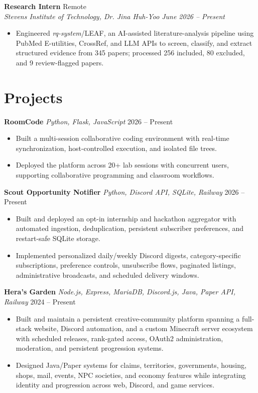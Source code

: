 \documentclass[letterpaper,10pt]{article}
\newcommand{\resumeentry}[4]{
  \noindent\textbf{#1} \hfill #2 \\
  \textit{#3} \hfill \textit{#4}
}
\newcommand{\projectentry}[3]{
  \noindent\textbf{#1} \textbar{} \textit{#2} \hfill #3
}
\begin{document}
\smallskip

\resumeentry
  {Research Intern}{Remote}
  {Stevens Institute of Technology, Dr. Jina Huh-Yoo}{June 2026 -- Present}
\begin{itemize}
  \item Engineered \textit{rq-system}/LEAF, an AI-assisted literature-analysis pipeline using PubMed E-utilities, CrossRef, and LLM APIs to screen, classify, and extract structured evidence from 345 papers; processed 256 included, 80 excluded, and 9 review-flagged papers.
\end{itemize}

\section{Projects}

\projectentry
  {RoomCode}
  {Python, Flask, JavaScript}
  {2026 -- Present}
\begin{itemize}
  \item Built a multi-session collaborative coding environment with real-time synchronization, host-controlled execution, and isolated file trees.
  \item Deployed the platform across 20+ lab sessions with concurrent users, supporting collaborative programming and classroom workflows.
\end{itemize}

\smallskip

\projectentry
  {Scout Opportunity Notifier}
  {Python, Discord API, SQLite, Railway}
  {2026 -- Present}
\begin{itemize}
  \item Built and deployed an opt-in internship and hackathon aggregator with automated ingestion, deduplication, persistent subscriber preferences, and restart-safe SQLite storage.
  \item Implemented personalized daily/weekly Discord digests, category-specific subscriptions, preference controls, unsubscribe flows, paginated listings, administrative broadcasts, and scheduled delivery windows.
\end{itemize}

\smallskip

\projectentry
  {Hera's Garden}
  {Node.js, Express, MariaDB, Discord.js, Java, Paper API, Railway}
  {2024 -- Present}
\begin{itemize}
  \item Built and maintain a persistent creative-community platform spanning a full-stack website, Discord automation, and a custom Minecraft server ecosystem with scheduled releases, rank-gated access, OAuth2 administration, moderation, and persistent progression systems.
  \item Designed Java/Paper systems for claims, territories, governments, housing, shops, mail, events, NPC societies, and economy features while integrating identity and progression across web, Discord, and game services.
\end{itemize}
\end{document}
